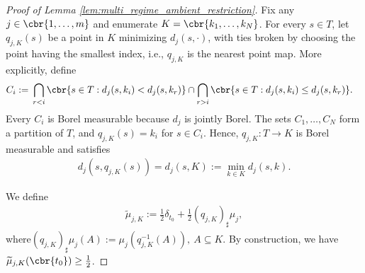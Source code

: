 \documentclass[11pt]{article}
\begin{document}
\begin{proof}[Proof of Lemma
\ref{lem:multi_regime_ambient_restriction}]
Fix any $j\in\cbr{1,\ldots,m}$ and enumerate $K=\cbr{k_1,\ldots,k_N}$.
For every $s\in T$, let $q_{j,K}(s)$ be a point in $K$ minimizing
$d_j(s,\cdot)$, with ties broken by choosing the point having the
smallest index, i.e., $q_{j,K}$ is the nearest point map. More explicitly, define
\begin{align*}
C_i
:={}&
\bigcap_{r<i}
\cbr{s\in T:d_j(s,k_i)<d_j(s,k_r)}
\cap
\bigcap_{r>i}
\cbr{s\in T:d_j(s,k_i)\le d_j(s,k_r)}.
\end{align*}
Every $C_i$ is Borel measurable because $d_j$ is jointly Borel. The
sets $C_1,\ldots,C_N$ form a partition of $T$, and
$q_{j,K}(s)=k_i$ for $s\in C_i$. Hence, $q_{j,K}:T\to K$ is Borel
measurable and satisfies
\begin{align*}
d_j(s,q_{j,K}(s))
=
d_j(s,K)
:=
\min_{k\in K}d_j(s,k).
\end{align*}

We define
\begin{align*}
\widetilde\mu_{j,K}
:=
\frac12\delta_{t_0}
+
\frac12(q_{j,K})_\sharp\mu_j,
\end{align*}
where$
(q_{j,K})_\sharp\mu_j(A)
:=
\mu_j(q_{j,K}^{-1}(A)),
\ A\subseteq K$.
By construction, we have $\widetilde\mu_{j,K}(\cbr{t_0})\ge\frac12$.


\end{proof}
\end{document}

